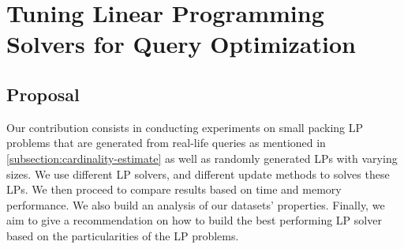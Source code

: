 
\chapter{Tuning Linear Programming Solvers for Query Optimization}\label{chapter:linearprogramming}

\section{Proposal}
Our contribution consists in conducting experiments on small packing LP problems that are generated from
real-life queries as mentioned in \ref{subsection:cardinality-estimate} as well as randomly generated
LPs with varying sizes. We use different LP solvers, and different update methods to solves these LPs.
We then proceed to compare results based on time and memory performance. We also build an analysis of our datasets' properties.
Finally, we aim to give a recommendation on how to build the best performing LP solver based on the
particularities of the LP problems.
